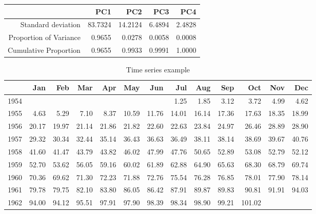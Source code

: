 \begin{table}[ht]
\begin{center}
\begin{tabular}{rrrrr}
  \hline
 & PC1 & PC2 & PC3 & PC4 \\ 
  \hline
Standard deviation & 83.7324 & 14.2124 & 6.4894 & 2.4828 \\ 
  Proportion of Variance & 0.9655 & 0.0278 & 0.0058 & 0.0008 \\ 
  Cumulative Proportion & 0.9655 & 0.9933 & 0.9991 & 1.0000 \\ 
   \hline
\end{tabular}
\end{center}
\end{table}
\begin{table}[h]
\begin{center}
\caption{Time series example}
\begin{tabular}{rrrrrrrrrrrrr}
  \hline
 & Jan & Feb & Mar & Apr & May & Jun & Jul & Aug & Sep & Oct & Nov & Dec \\ 
  \hline
1954 &  &  &  &  &  &  & 1.25 & 1.85 & 3.12 & 3.72 & 4.99 & 4.62 \\ 
  1955 & 4.63 & 5.29 & 7.10 & 8.37 & 10.59 & 11.76 & 14.01 & 16.14 & 17.36 & 17.63 & 18.35 & 18.99 \\ 
  1956 & 20.17 & 19.97 & 21.14 & 21.86 & 21.82 & 22.60 & 22.63 & 23.84 & 24.97 & 26.46 & 28.89 & 28.90 \\ 
  1957 & 29.32 & 30.34 & 32.44 & 35.14 & 36.43 & 36.63 & 36.49 & 38.11 & 38.14 & 38.69 & 39.67 & 40.76 \\ 
  1958 & 41.60 & 41.47 & 43.79 & 43.82 & 46.02 & 47.99 & 47.76 & 50.65 & 52.89 & 53.08 & 52.79 & 52.12 \\ 
  1959 & 52.70 & 53.62 & 56.05 & 59.16 & 60.02 & 61.89 & 62.88 & 64.90 & 65.63 & 68.30 & 68.79 & 69.74 \\ 
  1960 & 70.36 & 69.62 & 71.30 & 72.23 & 71.88 & 72.76 & 75.54 & 76.28 & 76.85 & 78.01 & 77.90 & 78.14 \\ 
  1961 & 79.78 & 79.75 & 82.10 & 83.80 & 86.05 & 86.42 & 87.91 & 89.87 & 89.83 & 90.81 & 91.91 & 94.03 \\ 
  1962 & 94.00 & 94.12 & 95.51 & 97.91 & 97.90 & 98.39 & 98.34 & 98.90 & 99.21 & 101.02 &  &  \\ 
   \hline
\end{tabular}
\end{center}
\end{table}
